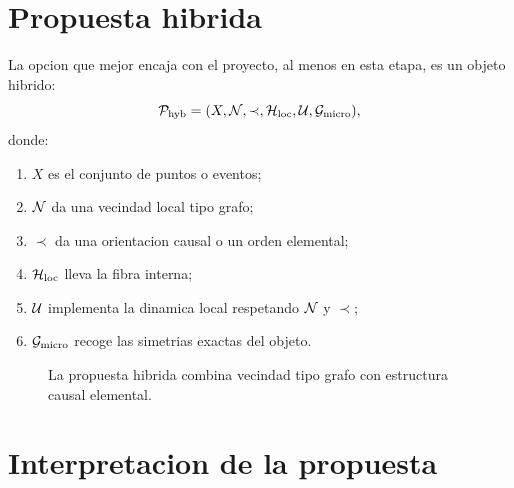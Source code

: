 \section{Propuesta hibrida}
La opcion que mejor encaja con el proyecto, al menos en esta etapa, es un objeto hibrido:
\begin{equation}
\mathcal{P}_{\mathrm{hyb}}=(X,\mathcal{N},\prec,\mathcal{H}_{\mathrm{loc}},\mathcal{U},\mathcal{G}_{\mathrm{micro}}),
\label{c29:eq:hybrid}
\end{equation}
donde:
\begin{enumerate}[label=\arabic*.]
    \item \(X\) es el conjunto de puntos o eventos;
    \item \(\mathcal{N}\) da una vecindad local tipo grafo;
    \item \(\prec\) da una orientacion causal o un orden elemental;
    \item \(\mathcal{H}_{\mathrm{loc}}\) lleva la fibra interna;
    \item \(\mathcal{U}\) implementa la dinamica local respetando \(\mathcal{N}\) y \(\prec\);
    \item \(\mathcal{G}_{\mathrm{micro}}\) recoge las simetrias exactas del objeto.
\end{enumerate}

\begin{figure}[h!]
\centering
{}
\caption{La propuesta hibrida combina vecindad tipo grafo con estructura causal elemental.}
\end{figure}

\section{Interpretacion de la propuesta}
